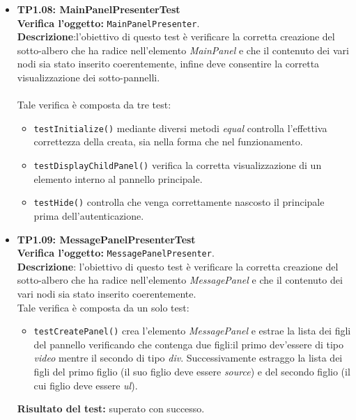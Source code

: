\begin{itemize}
\item \textbf{TP1.08: MainPanelPresenterTest}\\
\textbf{Verifica l'oggetto:} \texttt{MainPanelPresenter}.\\
\textbf{Descrizione}:l'obiettivo di questo test è verificare la corretta creazione del sotto-albero che ha radice nell'elemento \textit{MainPanel} e che il contenuto dei vari nodi sia stato inserito coerentemente, infine deve consentire la corretta visualizzazione dei sotto-pannelli.\\\\
Tale verifica è composta da tre test:
\begin{itemize}
\item \texttt{testInitialize()} mediante diversi metodi \textit{equal} controlla l'effettiva correttezza della  creata, sia nella forma che nel funzionamento.
\item \texttt{testDisplayChildPanel()} verifica la corretta visualizzazione di un elemento interno al pannello principale.
\item \texttt{testHide()} controlla che venga correttamente nascosto il  principale prima dell'autenticazione.
\end{itemize}

\item \textbf{TP1.09: MessagePanelPresenterTest}\\
\textbf{Verifica l'oggetto:} \texttt{MessagePanelPresenter}.\\
\textbf{Descrizione}: l'obiettivo di questo test è verificare la corretta creazione del sotto-albero che ha radice nell'elemento \textit{MessagePanel} e che il contenuto dei vari nodi sia stato inserito coerentemente.\\
Tale verifica è composta da un solo test:
\begin{itemize}
\item \texttt{testCreatePanel()} crea l'elemento \textit{MessagePanel} e estrae la lista dei figli del pannello verificando che contenga due figli:il primo dev'essere di tipo \textit{video} mentre il secondo di tipo \textit{div}.
Successivamente estraggo la lista dei figli del primo figlio (il suo figlio deve essere \textit{source}) e del secondo figlio (il cui figlio deve essere \textit{ul}).
\end{itemize}
\textbf{Risultato del test:} superato con successo.


\end{itemize}
